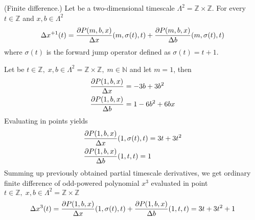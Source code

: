 \begin{cor}
    \label{finite_difference_case}
    (Finite difference.)
    Let be a two-dimensional timescale
    $\Lambda^2 = \mathbb{Z} \times \mathbb{Z}$.
    For every $t\in\mathbb{Z}$ and $x,b\in \Lambda^2$
    \begin{align*}
        \Delta x^{+1} (t)
        = \frac{\partial P ( m, b, x )}{\Delta x} (m, \sigma(t), t)
        + \frac{\partial P ( m, b, x )}{\Delta b}(m, \sigma(t), t)
    \end{align*}
    where $\sigma(t)$ is the forward jump operator defined as $\sigma(t) = t+1$.
\end{cor}
\begin{examp}
    \label{time_scale_z_example_1}
    Let be $t \in \mathbb{Z}, \; x,b \in \Lambda^2 = \mathbb{Z} \times \mathbb{Z}, \; m\in\mathbb{N}$ and let $m=1$, then
    \begin{align*}
        &\frac{\partial P ( 1, b, x )}{\Delta x}                = -3 b + 3 b^2 \\
        &\frac{\partial P ( 1, b, x )}{\Delta b}                = 1 - 6 b^2 + 6 b x
    \end{align*}
    Evaluating in points yields
    \begin{align*}
        &\frac{\partial P ( 1, b, x )}{\Delta x} (1, \sigma(t), t) = 3 t + 3 t^2 \\
        &\frac{\partial P ( 1, b, x )}{\Delta b}(1, t,t)           = 1
    \end{align*}
    Summing up previously obtained partial timescale derivatives, we get ordinary finite difference of odd-powered polynomial
    $x^{3}$ evaluated in point $ t\in\mathbb{Z}, \; x,b\in\Lambda^2 = \mathbb{Z} \times \mathbb{Z}$
    \begin{align*}
        \Delta x^{3}(t)
        = \frac{\partial P ( 1, b, x )}{\Delta x} (1, \sigma(t), t)
        + \frac{\partial P ( 1, b, x )}{\Delta b}(1,t,t)
        = 3 t + 3 t^2 + 1
    \end{align*}
\end{examp}
